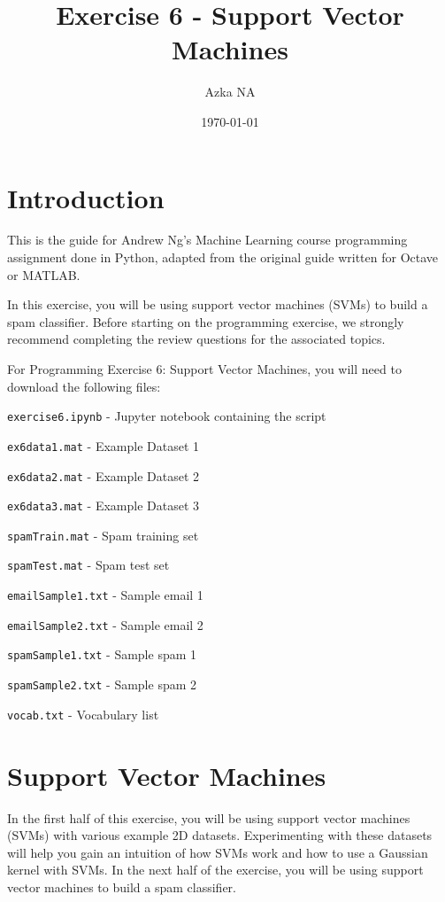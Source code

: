 \documentclass[12pt]{article}
\title{Exercise 6 - Support Vector Machines}
\author{Azka NA}
\date{\today}
\begin{document}
\maketitle


\section{Introduction}
This is the guide for Andrew Ng's Machine Learning course programming assignment done in Python, adapted from the original guide written for Octave or MATLAB.

In this exercise, you will be using support vector machines (SVMs) to build a spam classifier. Before starting on the programming exercise, we strongly recommend completing the review questions for the associated topics.

For Programming Exercise 6: Support Vector Machines, you will need to download the following files:

\texttt{exercise6.ipynb} - Jupyter notebook containing the script

\texttt{ex6data1.mat} - Example Dataset 1

\texttt{ex6data2.mat} - Example Dataset 2

\texttt{ex6data3.mat} - Example Dataset 3

\texttt{spamTrain.mat} - Spam training set

\texttt{spamTest.mat} - Spam test set

\texttt{emailSample1.txt} - Sample email 1

\texttt{emailSample2.txt} - Sample email 2

\texttt{spamSample1.txt} - Sample spam 1

\texttt{spamSample2.txt} - Sample spam 2

\texttt{vocab.txt} - Vocabulary list

\hrulefill

\section{Support Vector Machines}

In the first half of this exercise, you will be using support vector machines (SVMs) with various example 2D datasets. Experimenting with these datasets will help you gain an intuition of how SVMs work and how to use a Gaussian kernel with SVMs.  In the next half of the exercise, you will be using support vector machines to build a spam classifier.
\end{document}
